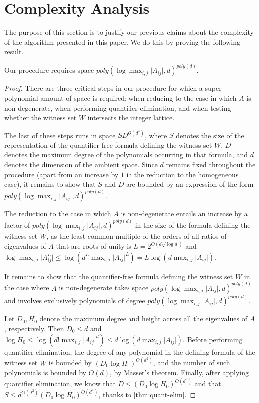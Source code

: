 \section{Complexity Analysis}
\label{sec:complexity}

The purpose of this section is to justify our previous claims about
the complexity of the algorithm presented in this paper. We do this by
proving the following result.

\begin{proposition}
Our procedure requires space $\mathit{poly}(\log\max_{i,j}\lvert A_{ij}\rvert,d)^{\mathit{poly}(d)}$.
\end{proposition}

\begin{proof}
There are three critical steps in our procedure for which a
super-polynomial amount of space is required: when reducing to the
case in which $A$ is non-degenerate, when performing quantifier
elimination, and when testing whether the witness set $W$ intersects
the integer lattice.

The last of these steps runs in space $SD^{O(d^4)}$, where $S$ denotes
the size of the representation of the quantifier-free formula defining
the witness set $W$, $D$ denotes the maximum degree of the polynomials
occurring in that formula, and $d$ denotes the dimension of the
ambient space. Since $d$ remains fixed throughout the procedure (apart
from an increase by $1$ in the reduction to the homogeneous case), it
remains to show that $S$ and $D$ are bounded by an expression of the
form $\mathit{poly}(\log\max_{i,j}\lvert
A_{ij}\rvert,d)^{\mathit{poly}(d)}$.

The reduction to the case in which $A$ is non-degenerate entails an
increase by a factor of $\mathit{poly}(\log\max_{i,j}\lvert
A_{ij}\rvert,d)^{\mathit{poly}(d)}$ in the size of the formula
defining the witness set $W$, as the least common multiple of the
orders of all ratios of eigenvalues of $A$ that are roots of unity is
$L=2^{O(d\sqrt{\log d})}$ and $\log\max_{i,j}\lvert A^L_{ij}\rvert\leq
\log (d^L\max_{i,j}\lvert A_{ij}\rvert^L)=L\log (d\max_{i,j}\lvert
A_{ij}\rvert)$.

It remains to show that the quantifier-free formula defining the witness set $W$ in the case where $A$ is non-degenerate takes space $\mathit{poly}(\log\max_{i,j}\lvert A_{ij}\rvert,d)^{\mathit{poly}(d)}$ and involves exclusively polynomials of degree $\mathit{poly}(\log\max_{i,j}\lvert A_{ij}\rvert,d)^{\mathit{poly}(d)}$.

Let $D_0,H_0$ denote the maximum degree and height across all the eigenvalues of $A$, respectively. Then $D_0\leq d$ and $\log H_0\leq\log (d!\max_{i,j}\lvert A_{ij}\rvert^d)\leq d\log (d\max_{i,j}\lvert A_{ij}\rvert)$. Before performing quantifier elimination, the degree of any polynomial in the defining formula of the witness set $W$ is bounded by $(D_0\log H_0)^{O(d^2)}$, and the number of such polynomials is bounded by $O(d)$, by Masser's theorem. Finally, after applying quantifier elimination, we know that $D\leq(D_0\log H_0)^{O(d^3)}$ and that $S\leq d^{O(d^2)}(D_0\log H_0)^{O(d^4)}$, thanks to \cref{thm:quant-elim}.
\end{proof}

